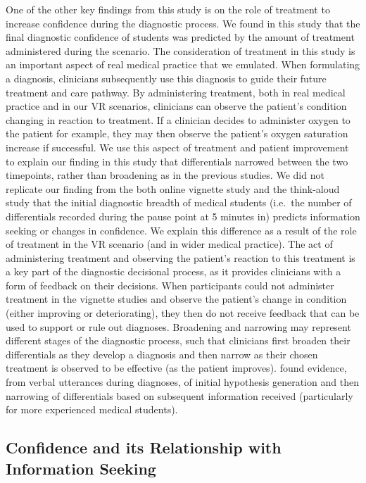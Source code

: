 \documentclass[a4paper, nobind]{templates/ociamthesis}
\begin{document}
One of the other key findings from this study is on the role of treatment to increase confidence during the diagnostic process. We found in this study that the final diagnostic confidence of students was predicted by the amount of treatment administered during the scenario. The consideration of treatment in this study is an important aspect of real medical practice that we emulated. When formulating a diagnosis, clinicians subsequently use this diagnosis to guide their future treatment and care pathway. By administering treatment, both in real medical practice and in our VR scenarios, clinicians can observe the patient's condition changing in reaction to treatment. If a clinician decides to administer oxygen to the patient for example, they may then observe the patient's oxygen saturation increase if successful. We use this aspect of treatment and patient improvement to explain our finding in this study that differentials narrowed between the two timepoints, rather than broadening as in the previous studies. We did not replicate our finding from the both online vignette study and the think-aloud study that the initial diagnostic breadth of medical students (i.e.~the number of differentials recorded during the pause point at 5 minutes in) predicts information seeking or changes in confidence. We explain this difference as a result of the role of treatment in the VR scenario (and in wider medical practice). The act of administering treatment and observing the patient's reaction to this treatment is a key part of the diagnostic decisional process, as it provides clinicians with a form of feedback on their decisions. When participants could not administer treatment in the vignette studies and observe the patient's change in condition (either improving or deteriorating), they then do not receive feedback that can be used to support or rule out diagnoses. Broadening and narrowing may represent different stages of the diagnostic process, such that clinicians first broaden their differentials as they develop a diagnosis and then narrow as their chosen treatment is observed to be effective (as the patient improves). \textcite{arocha_novice_1995} found evidence, from verbal utterances during diagnoses, of initial hypothesis generation and then narrowing of differentials based on subsequent information received (particularly for more experienced medical students).

\subsection{Confidence and its Relationship with Information Seeking}\label{confidence-and-its-relationship-with-information-seeking}
\end{document}
